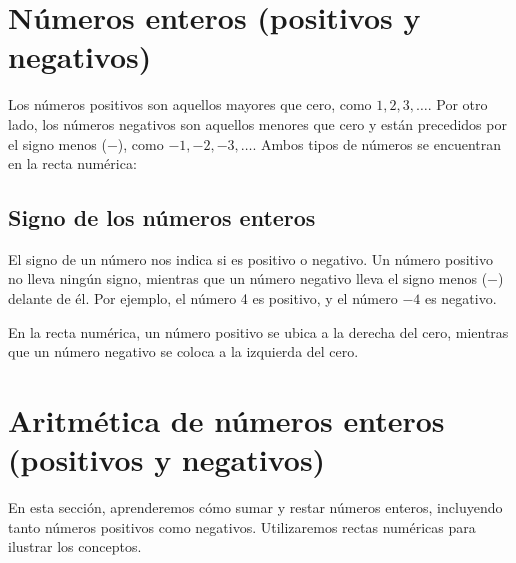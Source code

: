 \thispagestyle{plain}

\section{Números enteros (positivos y negativos)}
Los números positivos son aquellos mayores que cero, como $1, 2, 3, \ldots$. Por otro lado, los números negativos son aquellos menores que cero y están precedidos por el signo menos ($-$), como $-1, -2, -3, \ldots$. Ambos tipos de números se encuentran en la recta numérica:

\begin{center}
\end{center}

\subsection{Signo de los números enteros}
El signo de un número nos indica si es positivo o negativo. Un número positivo no lleva ningún signo, mientras que un número negativo lleva el signo menos ($-$) delante de él. Por ejemplo, el número 4 es positivo, y el número $-4$ es negativo.

En la recta numérica, un número positivo se ubica a la derecha del cero, mientras que un número negativo se coloca a la izquierda del cero.

\section{Aritmética de números enteros (positivos y negativos)}
En esta sección, aprenderemos cómo sumar y restar números enteros, incluyendo tanto números positivos como negativos. Utilizaremos rectas numéricas para ilustrar los conceptos.

